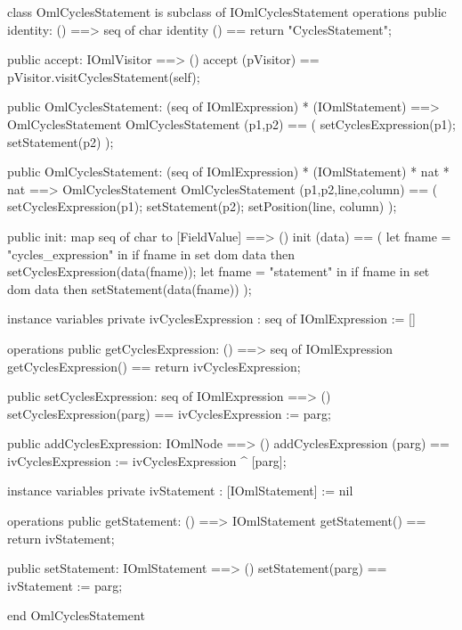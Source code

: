 \begin{vdm_al}
class OmlCyclesStatement is subclass of IOmlCyclesStatement
operations
  public identity: () ==> seq of char
  identity () == return "CyclesStatement";

  public accept: IOmlVisitor ==> ()
  accept (pVisitor) == pVisitor.visitCyclesStatement(self);

  public OmlCyclesStatement:
    (seq of IOmlExpression) *
    (IOmlStatement) ==> OmlCyclesStatement
  OmlCyclesStatement (p1,p2) == 
    ( setCyclesExpression(p1);
      setStatement(p2) );

  public OmlCyclesStatement:
    (seq of IOmlExpression) *
    (IOmlStatement) *
    nat *
    nat ==> OmlCyclesStatement
  OmlCyclesStatement (p1,p2,line,column) == 
    ( setCyclesExpression(p1);
      setStatement(p2);
      setPosition(line, column) );

  public init: map seq of char to [FieldValue] ==> ()
  init (data) ==
    ( let fname = "cycles_expression" in
        if fname in set dom data
        then setCyclesExpression(data(fname));
      let fname = "statement" in
        if fname in set dom data
        then setStatement(data(fname)) );

instance variables
  private ivCyclesExpression : seq of IOmlExpression := []

operations
  public getCyclesExpression: () ==> seq of IOmlExpression
  getCyclesExpression() == return ivCyclesExpression;

  public setCyclesExpression: seq of IOmlExpression ==> ()
  setCyclesExpression(parg) == ivCyclesExpression := parg;

  public addCyclesExpression: IOmlNode ==> ()
  addCyclesExpression (parg) == ivCyclesExpression := ivCyclesExpression ^ [parg];

instance variables
  private ivStatement : [IOmlStatement] := nil

operations
  public getStatement: () ==> IOmlStatement
  getStatement() == return ivStatement;

  public setStatement: IOmlStatement ==> ()
  setStatement(parg) == ivStatement := parg;

end OmlCyclesStatement
\end{vdm_al}


